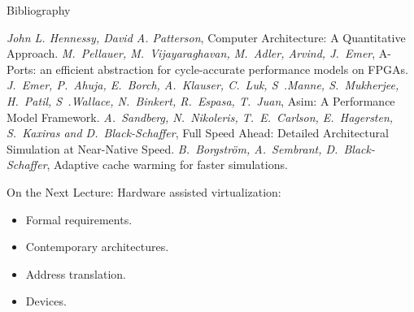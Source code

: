 \begin{frame}[allowframebreaks]{Bibliography}
\begin{thebibliography}{99}
\bibitem{} \textit{John L. Hennessy, David A. Patterson},
  Computer Architecture: A Quantitative Approach.
\bibitem{} \textit{M.~Pellauer, M.~Vijayaraghavan, M.~Adler, Arvind, J.~Emer},
  A-Ports: an efficient abstraction for cycle-accurate performance models on
  FPGAs.
\bibitem{} \textit{J.~Emer, P.~Ahuja, E.~Borch, A.~Klauser, C.~Luk,
  S~.Manne, S.~Mukherjee, H.~Patil, S~.Wallace, N.~Binkert, R.~Espasa, T.~Juan},
  Asim: A Performance Model Framework.
\bibitem{} \textit{A.~Sandberg, N.~Nikoleris, T.~E.~Carlson, E.~Hagersten,
  S.~Kaxiras and D.~Black-Schaffer}, Full Speed Ahead: Detailed Architectural
  Simulation at Near-Native Speed.
\bibitem{} \textit{B.~Borgstr\"{o}m, A.~Sembrant, D.~Black-Schaffer}, Adaptive
  cache warming for faster simulations.
\end{thebibliography}
\end{frame}

\begin{frame}{On the Next Lecture:}
Hardware assisted virtualization:
\begin{itemize}
\item Formal requirements.
\item Contemporary architectures.
\item Address translation.
\item Devices.
\end{itemize}
\end{frame}

\finalslide


